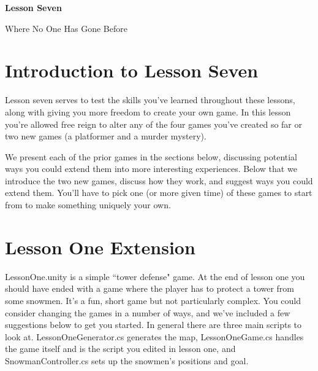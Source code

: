 \documentclass{article}
\begin{document}
\vspace*{\fill}
\begin{center}
{\Huge\bf Lesson Seven}

\vspace{2\baselineskip}

{\huge Where No One Has Gone Before}
\end{center}
\vspace*{\fill}
\newpage


\section{Introduction to Lesson Seven}

Lesson seven serves to test the skills you've learned throughout these lessons, along with giving you more freedom to create your own game. In this lesson you're allowed free reign to alter any of the four games you've created so far or two new games (a platformer and a murder mystery). 

We present each of the prior games in the sections below, discussing potential ways you could extend them into more interesting experiences. Below that we introduce the two new games, discuss how they work, and suggest ways you could extend them. You'll have to pick one (or more given time) of these games to start from to make something uniquely your own. 

\section{Lesson One Extension}

LessonOne.unity is a simple ``tower defense" game. At the end of lesson one you should have ended with a game where the player has to protect a tower from some snowmen. It's a fun, short game but not particularly complex. You could consider changing the games in a number of ways, and we've included a few suggestions below to get you started. In general there are three main scripts to look at. LessonOneGenerator.cs generates the map, LessonOneGame.cs handles the game itself and is the script you edited in lesson one, and SnowmanController.cs sets up the snowmen's positions and goal.
\end{document}

